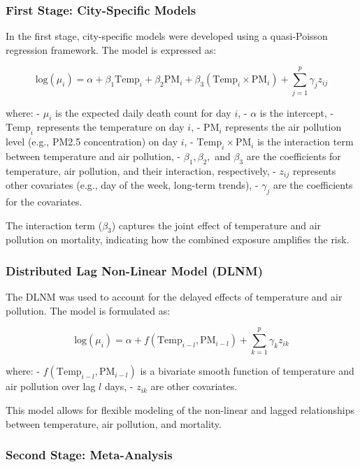 \documentclass[
]{krantz}
\begin{document}
\subsubsection{First Stage: City-Specific Models}\label{first-stage-city-specific-models}

In the first stage, city-specific models were developed using a quasi-Poisson regression framework. The model is expressed as:

\[ \text{log}(\mu_{i}) = \alpha + \beta_1 \text{Temp}_{i} + \beta_2 \text{PM}_{i} + \beta_3 (\text{Temp}_{i} \times \text{PM}_{i}) + \sum_{j=1}^{p} \gamma_j z_{ij} \]

where:
- \(\mu_{i}\) is the expected daily death count for day \(i\),
- \(\alpha\) is the intercept,
- \(\text{Temp}_{i}\) represents the temperature on day \(i\),
- \(\text{PM}_{i}\) represents the air pollution level (e.g., PM2.5 concentration) on day \(i\),
- \(\text{Temp}_{i} \times \text{PM}_{i}\) is the interaction term between temperature and air pollution,
- \(\beta_1, \beta_2,\) and \(\beta_3\) are the coefficients for temperature, air pollution, and their interaction, respectively,
- \(z_{ij}\) represents other covariates (e.g., day of the week, long-term trends),
- \(\gamma_j\) are the coefficients for the covariates.

The interaction term (\(\beta_3\)) captures the joint effect of temperature and air pollution on mortality, indicating how the combined exposure amplifies the risk.

\subsubsection{Distributed Lag Non-Linear Model (DLNM)}\label{distributed-lag-non-linear-model-dlnm-1}

The DLNM was used to account for the delayed effects of temperature and air pollution. The model is formulated as:

\[ \text{log}(\mu_{i}) = \alpha + f(\text{Temp}_{i-l}, \text{PM}_{i-l}) + \sum_{k=1}^{p} \gamma_k z_{ik} \]

where:
- \(f(\text{Temp}_{i-l}, \text{PM}_{i-l})\) is a bivariate smooth function of temperature and air pollution over lag \(l\) days,
- \(z_{ik}\) are other covariates.

This model allows for flexible modeling of the non-linear and lagged relationships between temperature, air pollution, and mortality.

\subsubsection{Second Stage: Meta-Analysis}\label{second-stage-meta-analysis}
\end{document}
